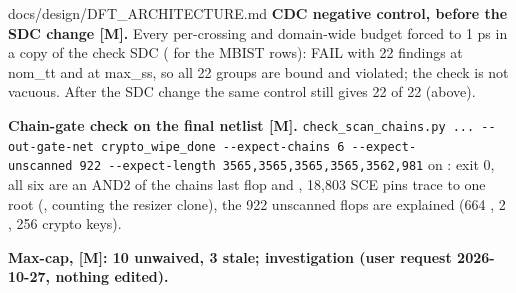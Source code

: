 \begin{relocated}{docs/design/DFT_ARCHITECTURE.md}
\textbf{CDC negative control, before the SDC change {[}M{]}.} Every
per-crossing and domain-wide budget forced to 1 ps in a copy of the
check SDC ( for the MBIST rows):
FAIL with 22 findings at nom\_tt and at max\_ss, so all 22 groups are
bound and violated; the check is not vacuous. After the SDC change the
same control still gives 22 of 22 (above).

\textbf{Chain-gate check on the final netlist {[}M{]}.}
\texttt{check\_\allowbreak{}scan\_\allowbreak{}chains.\allowbreak{}py\ .\allowbreak{}.\allowbreak{}.\allowbreak{}\ -\allowbreak{}-\allowbreak{}out-\allowbreak{}gate-\allowbreak{}net\ crypto\_\allowbreak{}wipe\_\allowbreak{}done\ -\allowbreak{}-\allowbreak{}expect-\allowbreak{}chains\ 6\ -\allowbreak{}-\allowbreak{}expect-\allowbreak{}unscanned\ 922\ -\allowbreak{}-\allowbreak{}expect-\allowbreak{}length\ 3565,\allowbreak{}3565,\allowbreak{}3565,\allowbreak{}3565,\allowbreak{}3562,\allowbreak{}981}
on : exit 0, all six
 are an AND2 of the chain\textquotesingle s last
flop and , 18,803 SCE pins trace to one root
(, counting the resizer clone), the 922 unscanned
flops are explained (664 , 2 , 256 crypto
keys).

\textbf{Max-cap,  {[}M{]}: 10 unwaived, 3 stale;
investigation (user request 2026-10-27, nothing edited).}

{\footnotesize\setlength{\tabcolsep}{3pt}

}
\end{relocated}
